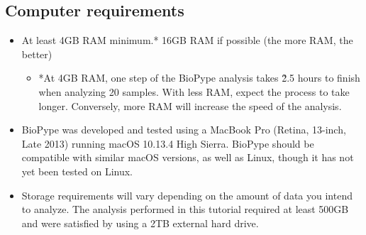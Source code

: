 \subsection*{Computer requirements}
\begin{itemize}
    \item At least 4GB RAM minimum.* 16GB RAM if possible (the more RAM, the better)
    \begin{itemize}
    \item *At 4GB RAM, one step of the BioPype analysis takes \~2.5 hours to finish when analyzing 20 samples. With less RAM, expect the process to take longer. Conversely, more RAM will increase the speed of the analysis. 
    \end{itemize}
    \item BioPype was developed and tested using a MacBook Pro (Retina, 13-inch, Late 2013) running macOS 10.13.4 High Sierra. BioPype should be compatible with similar macOS versions, as well as Linux, though it has not yet been tested on Linux.
    \item Storage requirements will vary depending on the amount of data you intend to analyze. The analysis performed in this tutorial required at least 500GB and were satisfied by using a 2TB external hard drive.
\end{itemize}


%





